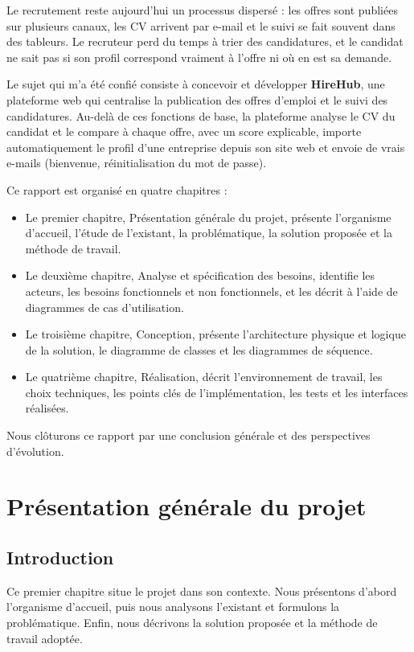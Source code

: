 \documentclass[12pt,a4paper]{report}
\newcommand{\plan}{%
  \begingroup
  \etocsettocstyle{\vspace{1.5cm}\noindent{\large\bfseries Plan}\par\vspace{6pt}}{}%
  \etocsetstyle{section}{}{}%
    {\noindent\hspace*{2em}\makebox[2.5em][l]{\small\bfseries\etocnumber}%
     {\small\bfseries\etocname}\dotfill{\small\bfseries\etocpage}\par}{}%
  \etocsetnexttocdepth{section}%
  \localtableofcontents
  \endgroup
  \clearpage}
\begin{document}
Le recrutement reste aujourd'hui un processus dispersé : les offres sont publiées sur plusieurs canaux, les CV arrivent par e-mail et le suivi se fait souvent dans des tableurs. Le recruteur perd du temps à trier des candidatures, et le candidat ne sait pas si son profil correspond vraiment à l'offre ni où en est sa demande.

Le sujet qui m'a été confié consiste à concevoir et développer \textbf{HireHub}, une plateforme web qui centralise la publication des offres d'emploi et le suivi des candidatures. Au-delà de ces fonctions de base, la plateforme analyse le CV du candidat et le compare à chaque offre, avec un score explicable, importe automatiquement le profil d'une entreprise depuis son site web et envoie de vrais e-mails (bienvenue, réinitialisation du mot de passe).

Ce rapport est organisé en quatre chapitres :
\begin{itemize}
  \item Le premier chapitre, \og Présentation générale du projet\fg{}, présente l'organisme d'accueil, l'étude de l'existant, la problématique, la solution proposée et la méthode de travail.
  \item Le deuxième chapitre, \og Analyse et spécification des besoins\fg{}, identifie les acteurs, les besoins fonctionnels et non fonctionnels, et les décrit à l'aide de diagrammes de cas d'utilisation.
  \item Le troisième chapitre, \og Conception\fg{}, présente l'architecture physique et logique de la solution, le diagramme de classes et les diagrammes de séquence.
  \item Le quatrième chapitre, \og Réalisation\fg{}, décrit l'environnement de travail, les choix techniques, les points clés de l'implémentation, les tests et les interfaces réalisées.
\end{itemize}
Nous clôturons ce rapport par une conclusion générale et des perspectives d'évolution.

\chapter{Présentation générale du projet}
\plan

\section*{Introduction}
Ce premier chapitre situe le projet dans son contexte. Nous présentons d'abord l'organisme d'accueil, puis nous analysons l'existant et formulons la problématique. Enfin, nous décrivons la solution proposée et la méthode de travail adoptée.
\end{document}
